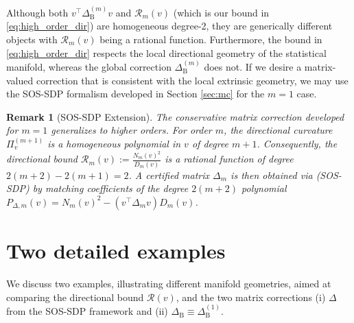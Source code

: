 \documentclass[pdflatex,sn-mathphys-num]{sn-jnl}%
\theoremstyle{thmstyleone}%
\theoremstyle{thmstyletwo}%
\newtheorem{remark}{Remark}%
\theoremstyle{thmstylethree}%
\begin{document}
Although both \(v^\top \Delta^{(m)}_{\mathrm{B}}v\) and \(\mathcal{R}_m(v)\) (which is our bound in \eqref{eq:high_order_dir}) are homogeneous degree-2, they are generically different objects with \(\mathcal{R}_m(v)\) being a rational function. Furthermore, the bound in \eqref{eq:high_order_dir} respects the local directional geometry of the statistical manifold, whereas the global correction \(\Delta^{(m)}_{\mathrm{B}}\) does not. If we desire a matrix-valued correction that is consistent with the local extrinsic geometry, we may use the SOS-SDP formalism developed in Section \ref{sec:mc} for the \(m=1\) case.

\begin{remark}[SOS-SDP Extension]
The conservative matrix correction developed for $m=1$ generalizes to higher orders. For order $m$, the directional curvature $\Pi_v^{(m+1)}$ is a homogeneous polynomial in $v$ of degree $m+1$. Consequently, the directional bound $\mathcal{R}_m(v):=\frac{N_m(v)^2}{D_m(v)}$ is a rational function of degree $2(m+2) - 2(m+1) = 2$. A certified matrix $\Delta_m$ is then obtained via (SOS-SDP) by matching coefficients of the degree $2(m+2)$ polynomial $P_{\Delta, m}(v) = N_m(v)^2 - (v^\top \Delta_m v) D_m(v)$.
\end{remark}

\section{Two detailed examples}
\label{sec:ex}
We discuss two examples, illustrating different manifold geometries, aimed at comparing the directional bound \(\mathcal{R}(v)\), and the two matrix corrections (i) \(\Delta\) from the SOS-SDP framework and (ii) \(\Delta_\mathrm{B}\equiv \Delta^{(1)}_{\mathrm{B}}\).
\end{document}
